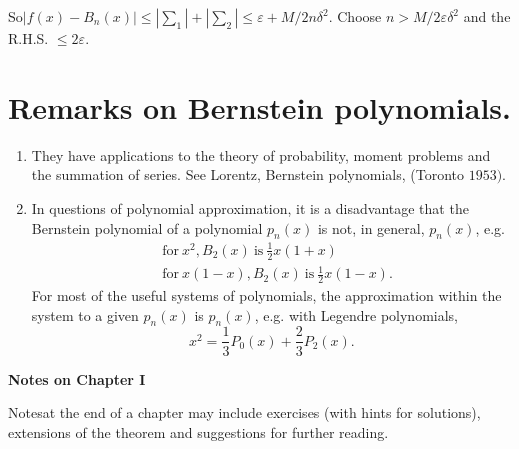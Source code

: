 So\pageoriginale  $ | f (x) - B_n (x) | \leq | \sum_1 | + | \sum_2 | \leq
\varepsilon + M/2n \delta^2 $. Choose $n > M/2 \varepsilon \delta^2 $  and
the R.H.S. $ \leq 2 \varepsilon $.

\section*{Remarks on Bernstein polynomials.}

\begin{enumerate}[(1)]
\item They have applications to the theory of probability, moment
  problems and the  summation of series. See Lorentz, Bernstein
  polynomials, (Toronto $ 1953) $. 
\item In questions of polynomial approximation, it is a disadvantage
  that the Bernstein polynomial of a polynomial $ p_n (x) $ is not, in
  general, $ p_n (x)$, e.g. 
  \begin{align*}
    &\text{for}~ x^2, B_2 (x) ~\text{is}~ \frac{1}{2} x (1 + x) \\
    &\text{for}~ x (1 -x), B_2 (x) ~\text{is}~ \frac{1}{2} x (1 -x).
  \end{align*}
  For most of the useful systems of polynomials, the approximation
  within the system to a given $ p_n (x) $ is $ p_n (x)$, e.g. with
  Legendre polynomials,  
  $$
  x^2 = \frac{1}{3} P_0 (x) + \frac{2}{3} P_2 (x). 
  $$
\end{enumerate}

\begin{center}
\textbf{Notes on Chapter I}
\end{center}

Notes\pageoriginale at the end of a chapter may include exercises (with hints for
solutions), extensions of the theorem and suggestions for further
reading. 

